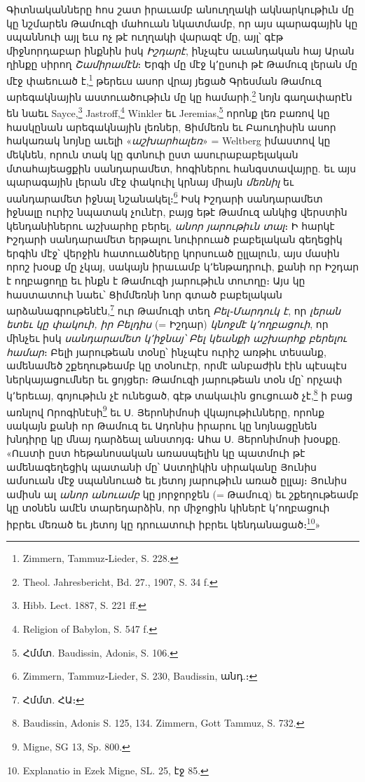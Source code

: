 \documentclass{article}
\begin{document}
{Գիտնականները հոս շատ իրաւամբ անուղղակի ակնարկութիւն մը կը նշմարեն Թամուզի մահուան նկատմամբ, որ այս պարագային կը սպաննուի այլ եւս ոչ թէ ուղղակի վարազէ մը, այլ՝ գէթ միջնորդաբար ինքնին իսկ \emph{Իշդարէ}, ինչպէս աւանդական հայ Արան ղինքը սիրող \emph{Շամիրամէն}։ Երգի մը մէջ կ՚ըսուի թէ Թամուզ լերան մը մէջ փաեուած է,\footnote{Zimmern, Tammuz֊Lieder, S. 228.} թերեւս ասոր վրայ յեցած Գրեսման Թամուզ արեգակնային աստուածութիւն մը կը համարի.\footnote{Theol. Jahresbericht, Bd. 27., 1907, S. 34 f.} նոյն գաղափարէն են նաեւ Sayce,\footnote{Hibb. Lect. 1887, S. 221 ff.} Jastroff,\footnote{Religion of Babylon, S. 547 f.} Winkler եւ Jeremias,\footnote{Հմմտ. Baudissin, Adonis, S. 106.} որոնք լեռ բառով կը հասկընան արեգակնային լեռներ, Ցիմմեռն եւ Բաուդիսին ասոր հակառակ նոյնը աւելի «\emph{աշխարհալեռ}» = Weltberg իմաստով կը մեկնեն, որուն տակ կը գտնուի ըստ ասուրաբաբելական մտահայեացքին սանդարամետ, հոգիներու հանգստավայրը. եւ այս պարագային լերան մէջ փակուիլ կրնայ միայն \emph{մեռնիլ} եւ սանդարամետ իջնալ նշանակել։\footnote{Zimmern, Tammuz֊Lieder, S. 230, Baudissin, անդ.։} Իսկ Իշդարի սանդարամետ իջնալը ուրիշ նպատակ չունէր, բայց եթէ Թամուզ անկից վերստին կենդանիներու աշխարհը բերել, \emph{անոր յարութիւն տալ}։ Ի հարկէ Իշդարի սանդարամետ երթալու նուիրուած բաբելական գեղեցիկ երգին մէջ՝ վերջին հատուածները կորսուած ըլլալուն, այս մասին որոշ խօսք մը չկայ, սակայն իրաւամբ կ՚ենթադրուի, քանի որ Իշդար է ողբացողը եւ ինքն է Թամուզի յարութիւն տուողը։ Այս կը հաստատուի նաեւ՝ Ցիմմեռնի նոր գտած բաբելական արձանագրութենէն,\footnote{Հմմտ. ՀԱ։} ուր Թամուզի տեղ \emph{Բել֊Մարդուկ է}, որ \emph{լերան ետեւ կը փակուի, իր Բելդիս} (= Իշդար) \emph{կնոջմէ կ՚ողբացուի}, որ մինչեւ իսկ \emph{սանդարամետ կ՚իջնայ՝ Բել կեանքի աշխարհք բերելու համար}։ Բելի յարութեան տօնը՝ ինչպէս ուրիշ առթիւ տեսանք, ամենամեծ շքեղութեամբ կը տօնուէր, որմէ անբաժին էին պէսպէս ներկայացումներ եւ ցոյցեր։ Թամուզի յարութեան տօն մը՝ որչափ կ՚երեւայ, գոյութիւն չէ ունեցած, գէթ տակաւին ցուցուած չէ,\footnote{Baudissin, Adonis S. 125, 134. Zimmern, Gott Tammuz, S. 732.} ի բաց առնլով Որոգինէսի\footnote{Migne, SG 13, Sp. 800.} եւ Ս. Յերոնիմոսի վկայութիւնները, որոնք սակայն քանի որ Թամուզ եւ Ադոնիս իրարու կը նոյնացընեն խնդիրը կը մնայ դարձեալ անստոյգ։ Ահա Ս. Յերոնիմոսի խօսքը. «Ուստի ըստ հեթանոսական առասպելին կը պատմուի թէ ամենագեղեցիկ պատանի մը՝ Աստղիկին սիրականը Յունիս ամսուան մէջ սպաննուած եւ յետոյ յարութիւն առած ըլլայ։ Յունիս ամիսն ալ \emph{անոր անուամբ} կը յորջորջեն (= Թամուզ) եւ շքեղութեամբ կը տօնեն ամէն տարեդարձին, որ միջոցին կիներէ կ՚ողբացուի իբրեւ մեռած եւ յետոյ կը դրուատուի իբրեւ կենդանացած։\footnote{Explanatio in Ezek Migne, SL. 25, էջ 85.}»

}
\end{document}
